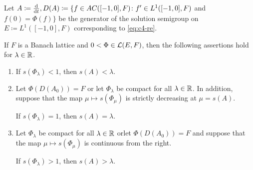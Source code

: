 \begin{theorem}\label{thm:c4-3.7}
%
%
%
Let $A \coloneqq \frac{\mathop{}\!\mathrm{d}{}}{\mathop{}\!\mathrm{d}{t}}, D(A) \coloneqq \{f \in AC([-1,0],F) \colon f' \in L^{1}([-1,0],F)$ and $f(0) = \Phi(f)\}$ be the generator of the solution semigroup on $E \coloneqq L^{1}([-1,0],F)$ corresponding to \eqref{eq:c4-re}. 

If $F$ is a Banach lattice and $0 < \Phi \in \mathcal{L}(E,F)$, then the following assertions hold for $\lambda \in \mathbb{R}$.
\begin{enumerate}[\upshape (i)]
\item \label{thm:c4-3.7-1}
If $s(\Phi_{\lambda}) < 1$, then $s(A) < \lambda$.
\item \label{thm:c4-3.7-2}
Let $\Phi(D(A_{0})) = F$ or let $\Phi_{\lambda}$ be compact for all $\lambda \in \mathbb{R}$. 
In addition, suppose that the map $\mu \mapsto s(\Phi_\mu)$ is strictly decreasing at $\mu = s(A)$. 

If $s(\Phi_{\lambda}) = 1$, then $s(A) = \lambda$.
\item \label{thm:c4-3.7-3}
Let $\Phi_{\lambda}$ be compact for all $\lambda \in \mathbb{R}$ \quad or\quad let $\Phi(D(A_{0})) = F$ and suppose that the map $\mu \mapsto s(\Phi_\mu)$ is continuous from the right. 

If $s(\Phi_{\lambda}) > 1$, then $s(A) > \lambda$.
\end{enumerate}
\end{theorem}

